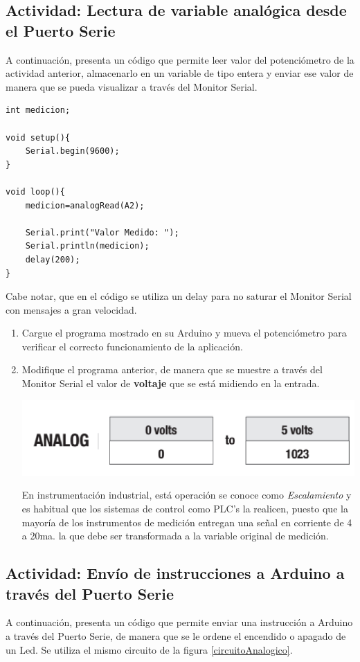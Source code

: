 \documentclass[letterpaper, 10pt]{report}
\begin{document}
\subsection{Actividad: Lectura de variable analógica desde el Puerto Serie }\label{puertoSerie}
A continuación, presenta un código que permite leer valor del potenciómetro de la actividad anterior, almacenarlo en un variable de tipo entera y enviar ese valor de manera que se pueda visualizar a través del Monitor Serial.

\begin{lstlisting}[style=myArduino]
int medicion;

void setup(){
	Serial.begin(9600);
}

void loop(){
	medicion=analogRead(A2);
	
	Serial.print("Valor Medido: ");
	Serial.println(medicion);
	delay(200);
}
\end{lstlisting} 

Cabe notar, que en el código se utiliza un delay para no saturar el Monitor Serial con mensajes a gran velocidad.

\begin{enumerate}
\item Cargue el programa mostrado en su Arduino y mueva el potenciómetro para verificar el correcto funcionamiento de la aplicación.

\item Modifique el programa anterior, de manera que se muestre a través del Monitor Serial el valor de \textbf{voltaje} que se está midiendo en la entrada.

\begin{center}
\includegraphics[scale=0.5]{anValue.png}
\end{center}

En instrumentación industrial, está operación se conoce como \emph{Escalamiento} y es habitual que los sistemas de control como PLC's la realicen, puesto que la mayoría de los instrumentos de medición entregan una señal en corriente de 4 a 20ma. la que debe ser transformada a la variable original de medición.
\end{enumerate}

\subsection{Actividad: Envío de instrucciones a Arduino a través del Puerto Serie}
A continuación, presenta un código que permite enviar una instrucción a Arduino a través del Puerto Serie, de manera que se le ordene el encendido o apagado de un Led. Se utiliza el mismo circuito de la figura \ref{circuitoAnalogico}.
\end{document}
